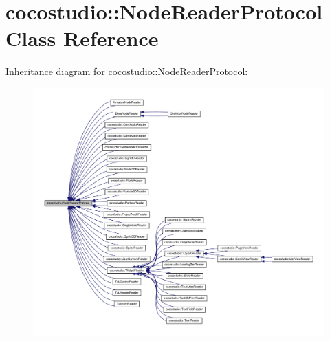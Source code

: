 \hypertarget{classcocostudio_1_1NodeReaderProtocol}{}\section{cocostudio\+:\+:Node\+Reader\+Protocol Class Reference}
\label{classcocostudio_1_1NodeReaderProtocol}


Inheritance diagram for cocostudio\+:\+:Node\+Reader\+Protocol\+:
\nopagebreak
\begin{figure}[H]
\begin{center}
\leavevmode
\includegraphics[width=350pt]{classcocostudio_1_1NodeReaderProtocol__inherit__graph}
\end{center}
\end{figure}
